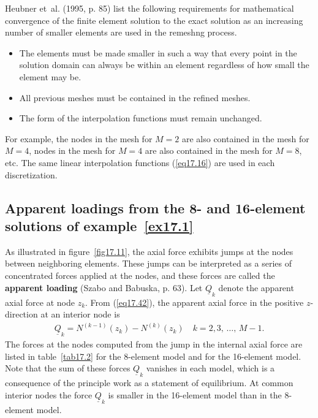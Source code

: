 \documentclass{AeroStructure-ERJohnson}
\begin{document}
Heubner et~al. (1995, p. 85) list the following requirements for mathematical convergence of the finite element solution to the exact solution as an increasing number of smaller elements are used in the remeshng process.
\begin{itemize}
\item The elements must be made smaller in such a way that every point in the solution domain can always be within an element regardless of how small the element may be.
\item All previous meshes must be contained in the refined meshes.
\item The form of the interpolation functions must remain unchanged.
\end{itemize}
For example, the nodes in the mesh for $\textit{M} = 2$ are also contained in the mesh for $\textit{M} = 4$, nodes in the mesh for $\textit{M} = 4$ are also contained in the mesh for $\textit{M} = 8$, etc. The same linear interpolation functions (\ref{eq17.16}) are used in each discretization.

\pagebreak

\subsection{Apparent loadings from the 8- and 16-element solutions of example~\ref{ex17.1}}\label{sec17.2.3}

As illustrated in figure~\ref{fig17.11}, the axial force exhibits jumps at the nodes between neighboring elements. These jumps can be interpreted as a series of concentrated forces applied at the nodes, and these forces are called the \textbf{apparent loading} (Szabo and Babuska, p. 63). Let $\underline{Q}_{k}$ denote the apparent axial force at node $z_{k}$. From (\ref{eq17.42}), the apparent axial force in the positive $z$-direction at an interior node is
\begin{align}\label{eq17.44}
\underline{Q}_{k}=N^{(k-1)}\left(z_{k}\right)-N^{(k)}\left(z_{k}\right) \quad k=2,3,\,\ldots,\,M-1.
\end{align}
The forces at the nodes computed from the jump in the internal axial force are listed in table~\ref{tab17.2} for the 8-element model and for the 16-element model. Note that the sum of these forces $\underline{Q}_{k}$ vanishes in each model, which is a consequence of the principle work as a statement of equilibrium. At common interior nodes the force $\underline{Q}_{k}$ is smaller in the 16-element model than in the 8-element model.
\end{document}
